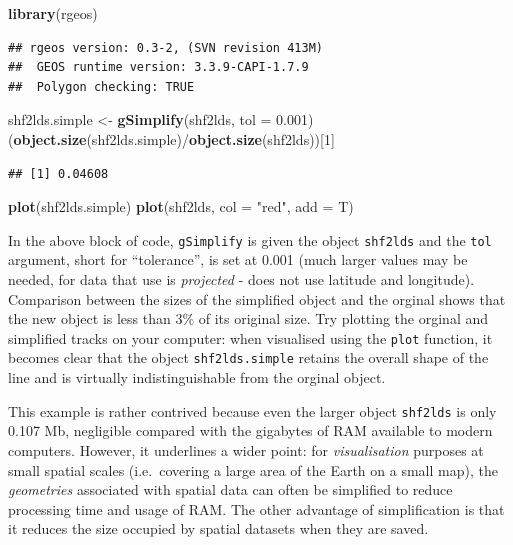 \documentclass[]{article}
\newenvironment{Shaded}{}{}
\newcommand{\KeywordTok}[1]{\textcolor[rgb]{0.00,0.44,0.13}{\textbf{{#1}}}}
\newcommand{\DataTypeTok}[1]{\textcolor[rgb]{0.56,0.13,0.00}{{#1}}}
\newcommand{\DecValTok}[1]{\textcolor[rgb]{0.25,0.63,0.44}{{#1}}}
\newcommand{\FloatTok}[1]{\textcolor[rgb]{0.25,0.63,0.44}{{#1}}}
\newcommand{\StringTok}[1]{\textcolor[rgb]{0.25,0.44,0.63}{{#1}}}
\newcommand{\NormalTok}[1]{{#1}}
\begin{document}
\begin{Shaded}
\begin{Highlighting}[]
\KeywordTok{library}\NormalTok{(rgeos)}
\end{Highlighting}
\end{Shaded}

\begin{verbatim}
## rgeos version: 0.3-2, (SVN revision 413M)
##  GEOS runtime version: 3.3.9-CAPI-1.7.9 
##  Polygon checking: TRUE
\end{verbatim}

\begin{Shaded}
\begin{Highlighting}[]
\NormalTok{shf2lds.simple <-}\StringTok{ }\KeywordTok{gSimplify}\NormalTok{(shf2lds, }\DataTypeTok{tol =} \FloatTok{0.001}\NormalTok{)}
\NormalTok{(}\KeywordTok{object.size}\NormalTok{(shf2lds.simple)/}\KeywordTok{object.size}\NormalTok{(shf2lds))[}\DecValTok{1}\NormalTok{]}
\end{Highlighting}
\end{Shaded}

\begin{verbatim}
## [1] 0.04608
\end{verbatim}

\begin{Shaded}
\begin{Highlighting}[]
\KeywordTok{plot}\NormalTok{(shf2lds.simple)}
\KeywordTok{plot}\NormalTok{(shf2lds, }\DataTypeTok{col =} \StringTok{"red"}\NormalTok{, }\DataTypeTok{add =} \NormalTok{T)}
\end{Highlighting}
\end{Shaded}

In the above block of code, \texttt{gSimplify} is given the object
\texttt{shf2lds} and the \texttt{tol} argument, short for ``tolerance'',
is set at 0.001 (much larger values may be needed, for data that use is
\emph{projected} - does not use latitude and longitude). Comparison
between the sizes of the simplified object and the orginal shows that
the new object is less than 3\% of its original size. Try plotting the
orginal and simplified tracks on your computer: when visualised using
the \texttt{plot} function, it becomes clear that the object
\texttt{shf2lds.simple} retains the overall shape of the line and is
virtually indistinguishable from the orginal object.

This example is rather contrived because even the larger object
\texttt{shf2lds} is only 0.107 Mb, negligible compared with the
gigabytes of RAM available to modern computers. However, it underlines a
wider point: for \emph{visualisation} purposes at small spatial scales
(i.e.~covering a large area of the Earth on a small map), the
\emph{geometries} associated with spatial data can often be simplified
to reduce processing time and usage of RAM. The other advantage of
simplification is that it reduces the size occupied by spatial datasets
when they are saved.
\end{document}
